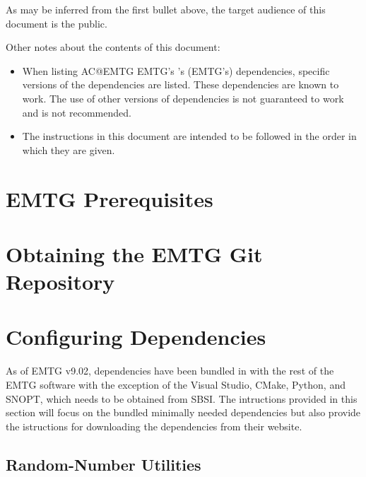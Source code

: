 \documentclass[11pt]{article}
\makeatletter
\newcommand{\acposs}[1]{%
	\expandafter\ifx\csname AC@#1\endcsname\AC@used
	\acs{#1}'s%
	\else
	\aclu{#1}'s (\acs{#1}'s)%
	\fi
}
\makeatother
\begin{document}
\noindent As may be inferred from the first bullet above, the target audience of this document is the public.

Other notes about the contents of this document:

\begin{itemize}
	\item When listing \acposs{EMTG} dependencies, specific versions of the dependencies are listed. These dependencies are known to work. The use of other versions of dependencies is not guaranteed to work and is not recommended.
	\item The instructions in this document are intended to be followed in the order in which they are given.
\end{itemize}

\section{EMTG Prerequisites}
\label{sec:install_prerequisites}



\section{Obtaining the EMTG Git Repository}
\label{sec:obtaining_emtg}



\section{Configuring Dependencies}
\label{sec:obtaining_dependencies}
\noindent As of EMTG v9.02, dependencies have been bundled in with the rest of the EMTG software with the exception of the Visual Studio, CMake, Python, and \ac{SNOPT}, which needs to be obtained from \ac{SBSI}. The intructions provided in this section will focus on the bundled minimally needed dependencies but also provide the istructions for downloading the dependencies from their website.

\subsection{Random-Number Utilities}
\label{sec:randutils}
\end{document}
